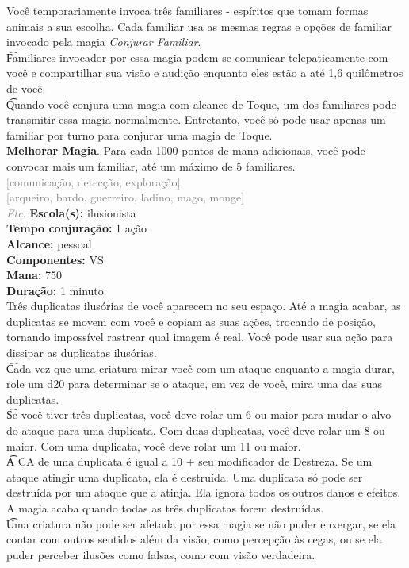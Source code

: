 \documentclass{RPG_Adventure}[2021/10/20]
\begin{document}
{\normalsize Você temporariamente invoca três familiares - espíritos que tomam formas animais a sua escolha. Cada familiar usa as mesmas regras e opções de familiar invocado pela magia \textit{Conjurar Familiar}.\\\t Familiares invocador por essa magia podem se comunicar telepaticamente com você e compartilhar sua visão e audição enquanto eles estão a até 1,6 quilômetros de você.\\\t Quando você conjura uma magia com alcance de Toque, um dos familiares pode transmitir essa magia normalmente. Entretanto, você só pode usar apenas um familiar por turno para conjurar uma magia de Toque.\\\t \textbf{Melhorar Magia}. Para cada 1000 pontos de mana adicionais, você pode convocar mais um familiar, até um máximo de 5 familiares.\\}
{\scriptsize \textcolor{gray}{[comunicação, detecção, exploração]\\}}
{\scriptsize \textcolor{gray}{[arqueiro, bardo, guerreiro, ladino, mago, monge]\\}}
{\tiny \textcolor{gray}{\textit{Etc.}}}\jump{}
{\small \t \textbf{Escola(s):} ilusionista\\\t \textbf{Tempo conjuração:} 1 ação\\\t \textbf{Alcance:} pessoal\\\t \textbf{Componentes:} VS\\\t \textbf{Mana:} 750\\\t \textbf{Duração:} 1 minuto\\}
{\normalsize Três duplicatas ilusórias de você aparecem no seu espaço.  Até a magia acabar, as duplicatas se movem com você e copiam as suas ações, trocando de posição, tornando impossível rastrear qual imagem é real. Você pode usar sua ação para dissipar as duplicatas ilusórias.\\\t Cada vez que uma criatura mirar você com um ataque enquanto a magia durar, role um d20 para determinar se o ataque, em vez de você, mira uma das suas duplicatas.\\\t Se você tiver três duplicatas, você deve rolar um 6 ou maior para mudar o alvo do ataque para uma duplicata.  Com duas duplicatas, você deve rolar um 8 ou maior. Com uma duplicata, você deve rolar um 11 ou maior.\\\t A CA de uma duplicata é igual a 10 + seu modificador de Destreza. Se um ataque atingir uma duplicata, ela é destruída. Uma duplicata só pode ser destruída por um ataque que a atinja. Ela ignora todos os outros danos e efeitos. A magia acaba quando todas as três duplicatas forem destruídas.\\\t Uma criatura não pode ser afetada por essa magia se não puder enxergar, se ela contar com outros sentidos além da visão, como percepção às cegas, ou se ela puder perceber ilusões como falsas, como com visão verdadeira.\\}
\end{document}
